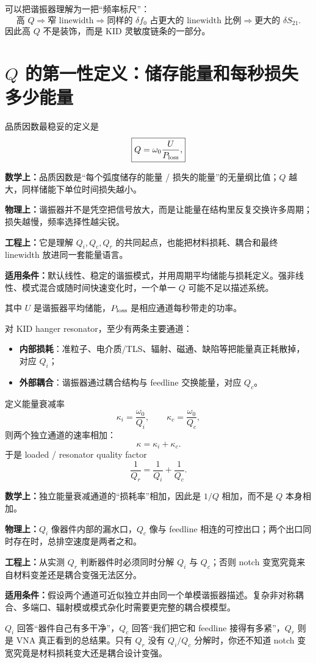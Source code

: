 \documentclass[11pt,a4paper,openany]{ctexrep}
\newcommand{\formulaexplain}[4]{%
\begin{formulaguidebox}
\textbf{\color{KidBlue}数学上：}#1\par
\textbf{\color{KidTeal}物理上：}#2\par
\textbf{\color{KidGold!55!black}工程上：}#3\par
\textbf{\color{KidRed}适用条件：}#4
\end{formulaguidebox}%
}
\begin{document}
可以把谐振器理解为一把“频率标尺”：
\[
\boxed{
\text{高 }Q
\Rightarrow
\text{窄 linewidth}
\Rightarrow
\text{同样的 }\delta f_0\text{ 占更大的 linewidth 比例}
\Rightarrow
\text{更大的 }\delta S_{21}.
}
\]
因此高 $Q$ 不是装饰，而是 KID 灵敏度链条的一部分。

\section{$Q$ 的第一性定义：储存能量和每秒损失多少能量}

品质因数最稳妥的定义是
\[
\boxed{
Q=\omega_0\frac{U}{P_{\rm loss}},
}
\]
\formulaexplain
{品质因数是“每个弧度储存的能量 / 损失的能量”的无量纲比值；$Q$ 越大，同样储能下单位时间损失越小。}
{谐振器并不是凭空把信号放大，而是让能量在结构里反复交换许多周期；损失越慢，频率选择性越尖锐。}
{它是理解 $Q_i,Q_c,Q_r$ 的共同起点，也能把材料损耗、耦合和最终 linewidth 放进同一套能量语言。}
{默认线性、稳定的谐振模式，并用周期平均储能与损耗定义。强非线性、模式混合或随时间快速变化时，一个单一 $Q$ 可能不足以描述系统。}
其中 $U$ 是谐振器平均储能，$P_{\rm loss}$ 是相应通道每秒带走的功率。

对 KID hanger resonator，至少有两条主要通道：
\begin{itemize}
  \item \textbf{内部损耗}：准粒子、电介质/TLS、辐射、磁通、缺陷等把能量真正耗散掉，对应 $Q_i$；
  \item \textbf{外部耦合}：谐振器通过耦合结构与 feedline 交换能量，对应 $Q_c$。
\end{itemize}

定义能量衰减率
\[
\kappa_i=\frac{\omega_0}{Q_i},
\qquad
\kappa_c=\frac{\omega_0}{Q_c},
\]
则两个独立通道的速率相加：
\[
\kappa=\kappa_i+\kappa_c.
\]
于是 loaded / resonator quality factor
\[
\boxed{
\frac{1}{Q_r}=\frac{1}{Q_i}+\frac{1}{Q_c}.
}
\]
\formulaexplain
{独立能量衰减通道的“损耗率”相加，因此是 $1/Q$ 相加，而不是 $Q$ 本身相加。}
{$Q_i$ 像器件内部的漏水口，$Q_c$ 像与 feedline 相连的可控出口；两个出口同时存在时，总排空速度是两者之和。}
{从实测 $Q_r$ 判断器件时必须同时分解 $Q_i$ 与 $Q_c$；否则 notch 变宽究竟来自材料变差还是耦合变强无法区分。}
{假设两个通道可近似独立并由同一个单模谐振器描述。复杂非对称耦合、多端口、辐射模或模式杂化时需要更完整的耦合模模型。}

\begin{intuitionbox}
$Q_i$ 回答“器件自己有多干净”，$Q_c$ 回答“我们把它和 feedline 接得有多紧”，$Q_r$ 则是 VNA 真正看到的总结果。只有 $Q_r$ 没有 $Q_i/Q_c$ 分解时，你还不知道 notch 变宽究竟是材料损耗变大还是耦合设计变强。
\end{intuitionbox}
\end{document}
